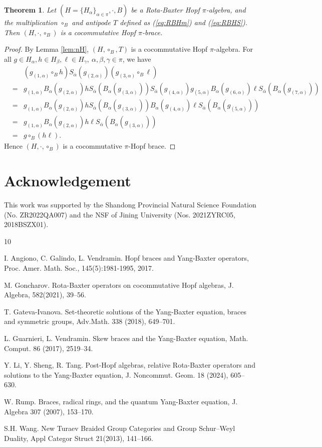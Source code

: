 \documentclass[11pt]{article}
\def\a{\alpha}
\def\b{\beta}
\def\g{\gamma}
\newtheorem{theorem}{Theorem}[section]
\begin{document}
\begin{theorem}  \label{thm:hb}
Let $(H=\{H_\a\}_{\a\in\pi},\cdot,B)$ be a Rota-Baxter Hopf $\pi$-algebra, and  the multiplication $\circ_B$ and antipode $T$ defined as (\ref{eq:RBHm}) and (\ref{eq:RBHS}). 
Then $(H,\cdot,\circ_B)$ is a cocommutative Hopf $\pi$-brace.
\end{theorem}
\begin{proof}
By Lemma \ref{lem:nH}, $(H,\circ_B,T)$ is a cocommutative Hopf $\pi$-algebra. For all $g\in H_\a, h\in H_\b, \ell\in H_\g, ~\a,\b,\g\in\pi$, we have
\begin{eqnarray*}
& & (g_{(1,\a)}\circ_B h)S_{\bar{\a}}(g_{(2,\a)})(g_{(3,\a)}\circ_B \ell) \\
&=& g_{(1,\a)}B_\a(g_{(2,\a)})hS_{\bar{\a}}(B_\a(g_{(3,\a)})) S_{\bar{\a}}(g_{(4,\a)}) g_{(5,\a)}B_\a(g_{(6,\a)})\ell S_{\bar{\a}}(B_\a(g_{(7,\a)})) \\
&=& g_{(1,\a)}B_\a(g_{(2,\a)})hS_{\bar{\a}}(B_\a(g_{(3,\a)})) B_\a(g_{(4,\a)})\ell S_{\bar{\a}}(B_\a(g_{(5,\a)})) \\
&=& g_{(1,\a)}B_\a(g_{(2,\a)})h\ell S_{\bar{\a}}(B_\a(g_{(3,\a)})) \\
&=& g\circ_B(h\ell).
\end{eqnarray*}
Hence $(H,\cdot,\circ_B)$ is a cocommutative $\pi$-Hopf brace.
\end{proof}


\section*{Acknowledgement}

This work was supported by the Shandong Provincial Natural Science Foundation (No. ZR2022QA007) and the NSF of Jining University (Nos. 2021ZYRC05, 2018BSZX01).

\begin{thebibliography}{10}

 I. Angiono, C. Galindo, L. Vendramin. Hopf braces and Yang-Baxter operators, Proc. Amer. Math. Soc., 145(5):1981-1995, 2017.

 M. Goncharov. Rota-Baxter operators on cocommutative Hopf algebras, J.  Algebra, 582(2021), 39--56.

 T. Gateva-Ivanova. Set-theoretic solutions of the Yang-Baxter equation, braces and symmetric groups, Adv.Math. 338 (2018), 649--701.

 L. Guarnieri, L. Vendramin. Skew braces and the Yang-Baxter equation, Math. Comput. 86 (2017), 2519--34.

 Y. Li, Y. Sheng, R. Tang. Post-Hopf algebras, relative Rota-Baxter operators and solutions to the Yang-Baxter equation, J. Noncommut. Geom. 18 (2024), 605--630.
    
 W. Rump. Braces, radical rings, and the quantum Yang-Baxter equation, J. Algebra 307 (2007), 153--170.

 S.H. Wang. New Turaev Braided Group Categories and Group Schur–Weyl Duality, Appl Categor Struct 21(2013), 141--166.
\end{thebibliography}
\end{document}
